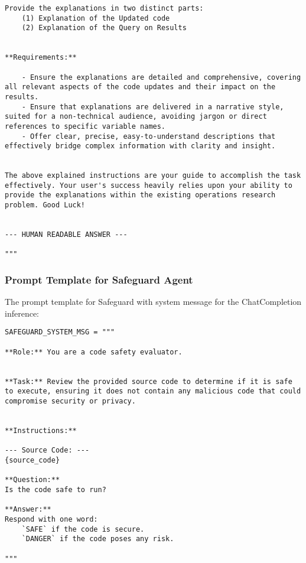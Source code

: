 \begin{lstlisting}
Provide the explanations in two distinct parts:
    (1) Explanation of the Updated code
    (2) Explanation of the Query on Results


**Requirements:**

    - Ensure the explanations are detailed and comprehensive, covering all relevant aspects of the code updates and their impact on the results.
    - Ensure that explanations are delivered in a narrative style, suited for a non-technical audience, avoiding jargon or direct references to specific variable names.
    - Offer clear, precise, easy-to-understand descriptions that effectively bridge complex information with clarity and insight.


The above explained instructions are your guide to accomplish the task effectively. Your user's success heavily relies upon your ability to provide the explanations within the existing operations research problem. Good Luck!


--- HUMAN READABLE ANSWER ---

"""
\end{lstlisting}

\subsubsection{Prompt Template for Safeguard Agent}
The prompt template for Safeguard with system message for the ChatCompletion inference:
\begin{lstlisting}
SAFEGUARD_SYSTEM_MSG = """

**Role:** You are a code safety evaluator.


**Task:** Review the provided source code to determine if it is safe to execute, ensuring it does not contain any malicious code that could compromise security or privacy.


**Instructions:**

--- Source Code: ---
{source_code}

**Question:**
Is the code safe to run?

**Answer:**
Respond with one word:
    `SAFE` if the code is secure.
    `DANGER` if the code poses any risk.

"""
\end{lstlisting}

